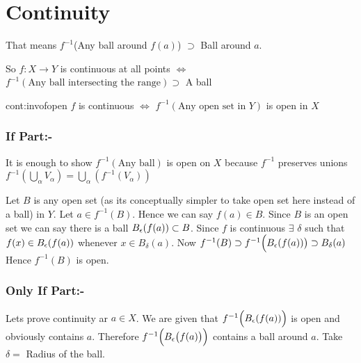 \section{Continuity}
\setlength{\parindent}{0cm}That means $f^{-1}$(Any ball around $f(a)$) $\supset$ Ball around $a$.\setlength{\parindent}{1cm}

So $f:X\to Y$ is continuous at all points $\iff$ $f^{-1}(\text{Any ball intersecting the range})\supset $ A ball
\begin{Theorem}{}{cont:invofopen}
	$f$ is continuous $\iff$ $f^{-1}(\text{Any open set in }Y)$ is open in $X$
\end{Theorem}
\begin{myproof}
	\subsubsection*{If Part:-}
	It is enough to show $f^{-1}(\text{Any ball})$ is open on $X$ because $f^{-1}$ preserves unions $f^{-1}\left(\bigcup\limits_{\alpha}V_{\alpha}\right)=\bigcup\limits_{\alpha}\left(f^{-1}(V_{\alpha})\right)$

	Let $B$ is any open set (as its conceptually simpler to take open set here instead of a ball) in $Y$. Let $a\in f^{-1}(B)$. Hence we can say $f(a)\in B$. Since $B$ is an open set we can say there is a ball $B_{\epsilon}(f(a))\subset B$. Since $f$ is continuous $\exists$ $\delta $ such that $f(x)\in B_{\epsilon}(f(a))$ whenever $x\in B_{\delta}(a)$. Now $f^{-1}(B)\supset f^{-1}\Big(B_{\epsilon}(f(a))\big)\supset B_{\delta}(a)$ Hence $f^{-1} (B)$ is open.

	\subsubsection*{Only If Part:-}
	Lets prove continuity ar $a\in X$. We are given that $f^{-1}\Big(B_{\epsilon}(f(a))\Big)$ is open and obviously contains $a$. Therefore $f^{-1}\Big(B_{\epsilon}\big(f(a)\big)\Big)$ contains a ball around $a$. Take $\delta=$ Radius of the ball.
\end{myproof}

